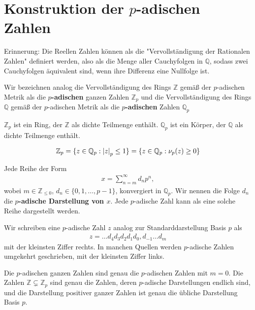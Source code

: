 \documentclass{report}
\newcommand*{\newpar}{\par\vspace{\baselineskip}\noindent}
\newcommand{\tbf}[1]{\textbf{#1}}
\newcommand{\bQ}{\mathbb{Q}}
\newcommand{\bZ}{\mathbb{Z}}
\begin{document}
	\section{Konstruktion der $p$-adischen Zahlen}
	Erinnerung: Die Reellen Zahlen können als die "Vervollständigung der Rationalen Zahlen" definiert werden, also als die Menge aller Cauchyfolgen in $\bQ$, sodass zwei Cauchyfolgen äquivalent sind, wenn ihre Differenz eine Nullfolge ist.
	\begin{definition}
		Wir bezeichnen analog die Vervollständigung des Rings $\bZ$ gemäß der $p$-adischen Metrik als die \tbf{$p$-adischen} ganzen Zahlen $\bZ_p$ und die Vervollständigung des Rings $\bQ$ gemäß der $p$-adischen Metrik als die \tbf{$p$-adischen} Zahlen $\bQ_p$
	\end{definition}
	\begin{proposition}
		$\bZ_p$ ist ein Ring, der $\bZ$ als dichte Teilmenge enthält. $\bQ_p$ ist ein Körper, der $\bQ$ als dichte Teilmenge enthält.
	\end{proposition}
	\begin{proposition}
		\begin{align*}
			\bZ_p = \{z \in \bQ_p : \abs{z}_p \leq 1\} = \{z \in \bQ_p : \nu_p(z) \geq 0\}
		\end{align*}
	\end{proposition}
	\begin{proposition}
		Jede Reihe der Form
		\begin{align*}
			x = \sum_{n = m}^\infty d_n p^n,
		\end{align*}
		wobei $m \in \bZ_{\leq 0}$, $d_n \in \{0,1,\hdots,p-1\}$, konvergiert in $\bQ_p$. Wir nennen die Folge $d_n$ die \tbf{$p$-adische Darstellung von $x$}. Jede $p$-adische Zahl kann als eine solche Reihe dargestellt werden.
	\end{proposition}
	\noindent Wir schreiben eine $p$-adische Zahl $z$ analog zur Standarddarstellung Basis $p$ als 
	\begin{align*}
		z = \hdots d_4 d_3 d_2 d_1 d_0, d_{-1} \hdots d_{m}
	\end{align*}
	mit der kleinsten Ziffer rechts. In manchen Quellen werden $p$-adische Zahlen umgekehrt geschrieben, mit der kleinsten Ziffer links.
	\newpar
	\noindent Die $p$-adischen ganzen Zahlen sind genau die $p$-adischen Zahlen mit $m = 0$. Die Zahlen $\bZ \subsetneq \bZ_p$ sind genau die Zahlen, deren $p$-adische Darstellungen endlich sind, und die Darstellung positiver ganzer Zahlen ist genau die übliche Darstellung Basis $p$.
\end{document}
